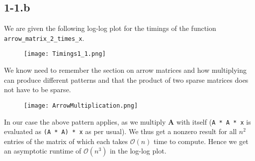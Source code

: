 \documentclass{article}
\begin{document}
\pagebreak 

\subsection*{1-1.b}
We are given the following log-log plot for the timings of the function \verb|arrow_matrix_2_times_x|.
\begin{figure}[!hbt]
    \centering
\texttt{[image: Timings1\_1.png]}
\end{figure}

We know need to remember the section on arrow matrices and how multiplying can produce different patterns and that the product of two sparse matrices does not have to be sparse.

\begin{figure}[!hbt]
    \centering
\texttt{[image: ArrowMultiplication.png]}
\end{figure}

\noindent In our case the above pattern applies, as we multiply $\mathbf{A}$ with itself (\verb|A * A * x| is evaluated as \verb|(A * A) * x| as per usual). We thus get a nonzero result for all $n^{2}$ entries of the matrix of which each takes $\mathcal{O}\left(n\right)$ time to compute. Hence we get an asymptotic runtime of $\mathcal{O}\left(n^{3}\right)$ in the log-log plot.

\pagebreak
\end{document}
